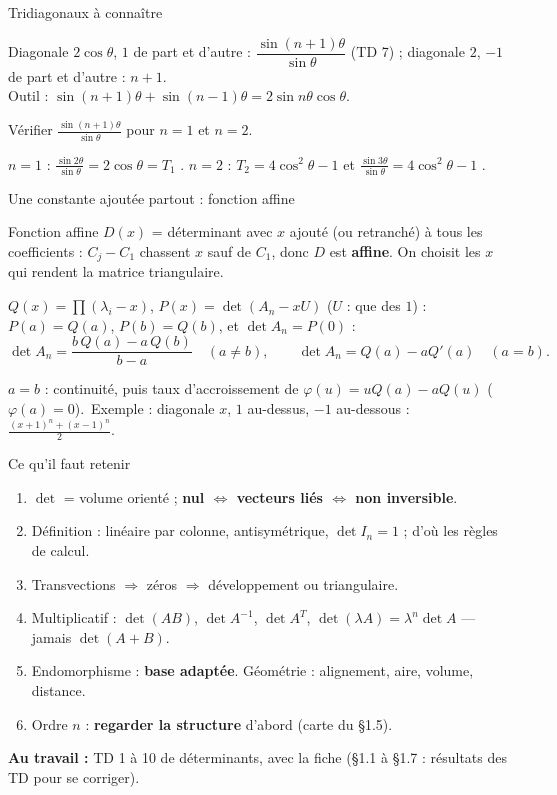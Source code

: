 \documentclass[aspectratio=169,11pt]{beamer}
\newcommand{\rep}[1]{\textcolor{Vert}{#1}}%
\begin{document}
\begin{frame}{Tridiagonaux à connaître}
\begin{FORM}[À connaître]
Diagonale $2\cos\theta$, $1$ de part et d'autre : $\dfrac{\sin(n+1)\theta}{\sin\theta}$ (TD 7) ; diagonale $2$, $-1$ de part et
d'autre : $n+1$.\\
Outil : $\sin(n+1)\theta+\sin(n-1)\theta=2\sin n\theta\cos\theta$.
\end{FORM}
\pause
\begin{ATOI}[Contrôle]
Vérifier $\frac{\sin(n+1)\theta}{\sin\theta}$ pour $n=1$ et $n=2$.
\end{ATOI}
\pause
$n=1$ : $\frac{\sin2\theta}{\sin\theta}=2\cos\theta=T_1$ \rep{\checkmark}.\qquad
$n=2$ : $T_2=4\cos^2\theta-1$ et $\frac{\sin3\theta}{\sin\theta}=4\cos^2\theta-1$ \rep{\checkmark}.
\end{frame}

\begin{frame}{Une constante ajoutée partout : fonction affine}
\begin{METH}{Fonction affine}
$D(x)$ = déterminant avec $x$ ajouté (ou retranché) à tous les coefficients : $C_j-C_1$ chassent $x$ sauf de $C_1$,
donc $D$ est \textbf{affine}. On choisit les $x$ qui rendent la matrice triangulaire.
\end{METH}
\pause
\begin{FORM}
$Q(x)=\prod(\lambda_i-x)$, $P(x)=\det(A_n-xU)$ ($U$ : que des $1$) : \ $P(a)=Q(a)$, $P(b)=Q(b)$, et $\det A_n=P(0)$ :
\[\det A_n=\frac{b\,Q(a)-a\,Q(b)}{b-a}\quad(a\neq b),\qquad\det A_n=Q(a)-aQ'(a)\quad(a=b).\]
\end{FORM}
\pause
{\small $a=b$ : continuité, puis taux d'accroissement de $\varphi(u)=uQ(a)-aQ(u)$ ($\varphi(a)=0$).\
Exemple : diagonale $x$, $1$ au-dessus, $-1$ au-dessous : $\frac{(x+1)^n+(x-1)^n}2$.}
\end{frame}

\begin{frame}{Ce qu'il faut retenir}
\begin{RETENIR}
\begin{enumerate}
\item $\det$ = volume orienté ; \textbf{nul $\iff$ vecteurs liés $\iff$ non inversible}.
\item Définition : linéaire par colonne, antisymétrique, $\det I_n=1$ ; d'où les règles de calcul.
\item Transvections $\Rightarrow$ zéros $\Rightarrow$ développement ou triangulaire.
\item Multiplicatif : $\det(AB)$, $\det A^{-1}$, $\det A^T$, $\det(\lambda A)=\lambda^n\det A$ --- jamais $\det(A+B)$.
\item Endomorphisme : \textbf{base adaptée}. Géométrie : alignement, aire, volume, distance.
\item Ordre $n$ : \textbf{regarder la structure} d'abord (carte du §1.5).
\end{enumerate}
\end{RETENIR}
\pause
\textbf{Au travail :} TD 1 à 10 de déterminants, avec la fiche (§1.1 à §1.7 : résultats des TD pour se corriger).
\end{frame}
\end{document}
